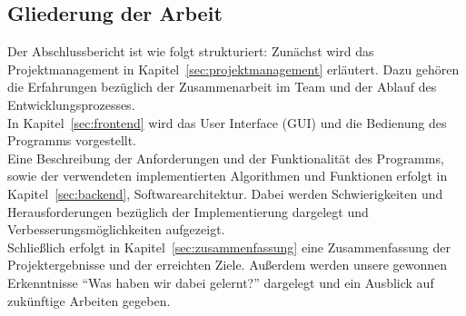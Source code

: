 \subsection{Gliederung der Arbeit}
\label{subsec:gliederung}
Der Abschlussbericht ist wie folgt strukturiert: Zunächst wird das Projektmanagement in Kapitel~\ref{sec:projektmanagement} erläutert. Dazu gehören die Erfahrungen bezüglich der Zusammenarbeit im Team und der Ablauf des Entwicklungsprozesses.\\

In Kapitel~\ref{sec:frontend} wird das User Interface (GUI) und die Bedienung des Programms vorgestellt.\\

Eine Beschreibung der Anforderungen und der Funktionalität des Programms, sowie der verwendeten \bzw implementierten Algorithmen und Funktionen erfolgt in Kapitel~\ref{sec:backend}, Softwarearchitektur. Dabei werden Schwierigkeiten und Herausforderungen bezüglich der Implementierung dargelegt und Verbesserungsmöglichkeiten aufgezeigt.\\

Schließlich erfolgt in Kapitel~\ref{sec:zusammenfassung} eine Zusammenfassung der Projektergebnisse und der erreichten Ziele. Außerdem werden unsere gewonnen Erkenntnisse \bzw "`Was haben wir dabei gelernt?"' dargelegt und ein Ausblick auf zukünftige Arbeiten gegeben.